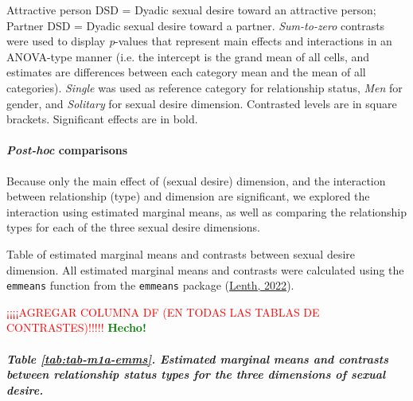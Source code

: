 \documentclass[
  bookmarksnumbered]{article}
\begin{document}
\begin{table}[H]
{\begin{threeparttable}
\begin{tablenotes}[para]
                              Attractive person DSD = Dyadic sexual desire toward an 
                              attractive person;
                              Partner DSD = Dyadic sexual desire toward a partner.
                              \textit{Sum-to-zero} contrasts were used to display
                              \textit{p}-values that represent main effects and interactions 
                              in an ANOVA-type manner (i.e. the intercept is the grand mean of 
                              all cells, and estimates are differences between each category
                              mean and the mean of all categories).
                              \textit{Single} was used as reference category
                              for relationship status, \textit{Men} for gender, 
                              and \textit{Solitary} for  sexual desire dimension.
                              Contrasted levels are in square brackets.
                              Significant effects are in bold.
\end{tablenotes}
\end{threeparttable}}
\end{table}

\hypertarget{post-hoc-comparisons}{%
\paragraph{\texorpdfstring{\emph{Post-hoc} comparisons}{Post-hoc comparisons}}\label{post-hoc-comparisons}}

Because only the main effect of (sexual desire) dimension, and the interaction between relationship (type) and dimension are significant, we explored the interaction using estimated marginal means, as well as comparing the relationship types for each of the three sexual desire dimensions.

Table of estimated marginal means and contrasts between sexual desire dimension. All estimated marginal means and contrasts were calculated using the \texttt{emmeans} function from the \texttt{emmeans} package (\protect\hyperlink{ref-emmeanscit}{Lenth, 2022}).

\textcolor{red}{¡¡¡¡AGREGAR COLUMNA DF (EN TODAS LAS TABLAS DE CONTRASTES)!!!!!} \textcolor{green}{\textbf{Hecho!}}

\hypertarget{table-reftabtab-m1a-emms.-estimated-marginal-means-and-contrasts-between-relationship-status-types-for-the-three-dimensions-of-sexual-desire.}{%
\subparagraph{Table \ref{tab:tab-m1a-emms}. Estimated marginal means and contrasts between relationship status types for the three dimensions of sexual desire.}\label{table-reftabtab-m1a-emms.-estimated-marginal-means-and-contrasts-between-relationship-status-types-for-the-three-dimensions-of-sexual-desire.}}
\end{document}
